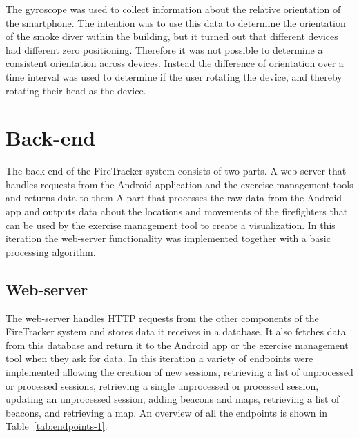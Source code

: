 \documentclass[../Main/thesis.tex]{subfiles}
\begin{document}
The gyroscope was used to collect information about the relative orientation of the smartphone. 
The intention was to use this data to determine the orientation of the smoke diver within the building, but it turned out that different devices had different zero positioning.
Therefore it was not possible to determine a consistent orientation across devices.
Instead the difference of orientation over a time interval was used to determine if the user rotating the device, and thereby rotating their head as the device. 

\section{Back-end}
The back-end of the FireTracker system consists of two parts.
A web-server that handles requests from the Android application and the exercise management tools and returns data to them
A part that processes the raw data from the Android app and outputs data about the locations and movements of the firefighters that can be used by the exercise management tool to create a visualization.
In this iteration the web-server functionality was implemented together with a basic processing algorithm.

\subsection{Web-server}
The web-server handles HTTP requests from the other components of the FireTracker system and stores data it receives in a database. 
It also fetches data from this database and return it to the Android app or the exercise management tool when they ask for data.
In this iteration a variety of endpoints were implemented allowing the creation of new sessions, retrieving a list of unprocessed or processed sessions, retrieving a single unprocessed or processed session, updating an unprocessed session, adding beacons and maps, retrieving a list of beacons, and retrieving a map. 
An overview of all the endpoints is shown in Table~\ref{tab:endpoints-1}.
\end{document}
